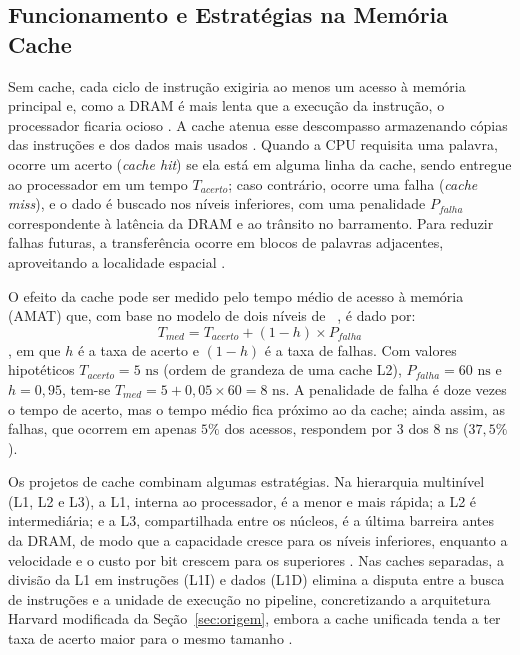 \documentclass[12pt]{article}
\begin{document}
\subsection{Funcionamento e Estratégias na Memória Cache}  \label{sec:amat}
Sem cache, cada ciclo de instrução exigiria ao menos um acesso à memória principal e, como a DRAM é mais lenta que a execução da instrução, o processador ficaria ocioso \cite{ferreira2015}. A cache atenua esse descompasso armazenando cópias das instruções e dos dados mais usados \cite{stallings2010, ferreira2015}. Quando a CPU requisita uma palavra, ocorre um acerto (\textit{cache hit}) se ela está em alguma linha da cache, sendo entregue ao processador em um tempo $T_{acerto}$; caso contrário, ocorre uma falha (\textit{cache miss}), e o dado é buscado nos níveis inferiores, com uma penalidade $P_{falha}$ correspondente à latência da DRAM e ao trânsito no barramento. Para reduzir falhas futuras, a transferência ocorre em blocos de palavras adjacentes, aproveitando a localidade espacial \cite{stallings2010, ferreira2015}.

O efeito da cache pode ser medido pelo tempo médio de acesso à memória (AMAT) que, com base no modelo de dois níveis de ~\cite{stallings2010}, é dado por:
\begin{equation}
T_{med} = T_{acerto} + (1 - h) \times P_{falha}
\end{equation}
, em que $h$ é a taxa de acerto e $(1 - h)$ é a taxa de falhas. Com valores hipotéticos $T_{acerto} = 5\text{ ns}$ (ordem de grandeza de uma cache L2), $P_{falha} = 60\text{ ns}$ e $h = 0,95$, tem-se $T_{med} = 5 + 0,05 \times 60 = 8\text{ ns}$. A penalidade de falha é doze vezes o tempo de acerto, mas o tempo médio fica próximo ao da cache; ainda assim, as falhas, que ocorrem em apenas $5\%$ dos acessos, respondem por 3 dos 8 ns ($37,5\%$).

Os projetos de cache combinam algumas estratégias. Na hierarquia multinível (L1, L2 e L3), a L1, interna ao processador, é a menor e mais rápida; a L2 é intermediária; e a L3, compartilhada entre os núcleos, é a última barreira antes da DRAM, de modo que a capacidade cresce para os níveis inferiores, enquanto a velocidade e o custo por bit crescem para os superiores \cite{stallings2010, ferreira2015}. Nas caches separadas, a divisão da L1 em instruções (L1I) e dados (L1D) elimina a disputa entre a busca de instruções e a unidade de execução no pipeline, concretizando a arquitetura Harvard modificada da Seção~\ref{sec:origem}, embora a cache unificada tenda a ter taxa de acerto maior para o mesmo tamanho \cite{stallings2010}.
\end{document}
